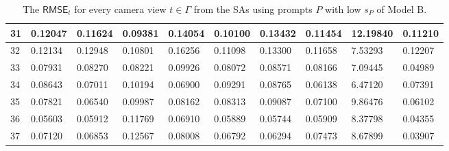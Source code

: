 \begin{table}[H]
{\begin{tabular}{|l|l|l|l|l|l|l|l|l|l|}
        31 & 0.12047 & 0.11624 & 0.09381 & 0.14054 & 0.10100 & 0.13432 & 0.11454 & 12.19840 & 0.11210 \\ \hline
        32 & 0.12134 & 0.12948 & 0.10801 & 0.16256 & 0.11098 & 0.13300 & 0.11658 & 7.53293 & 0.12207 \\ \hline
        33 & 0.07931 & 0.08270 & 0.08221 & 0.09926 & 0.08072 & 0.08571 & 0.08166 & 7.09445 & 0.04989 \\ \hline
        34 & 0.08643 & 0.07011 & 0.10194 & 0.06900 & 0.09291 & 0.08765 & 0.06138 & 6.47120 & 0.07391 \\ \hline
        35 & 0.07821 & 0.06540 & 0.09987 & 0.08162 & 0.08313 & 0.09087 & 0.07100 & 9.86476 & 0.06102 \\ \hline
        36 & 0.05603 & 0.05912 & 0.11769 & 0.06910 & 0.05889 & 0.05744 & 0.05909 & 8.37798 & 0.04355 \\ \hline
        37 & 0.07120 & 0.06853 & 0.12567 & 0.08008 & 0.06792 & 0.06294 & 0.07473 & 8.67899 & 0.03907 \\ \hline
    \end{tabular}}
	\caption{The $ \mathsf{RMSE}_t$ for every camera view $t \in \varGamma$ from the SAs using prompts $P$ with low $s_P$ of Model B.}
\end{table}


